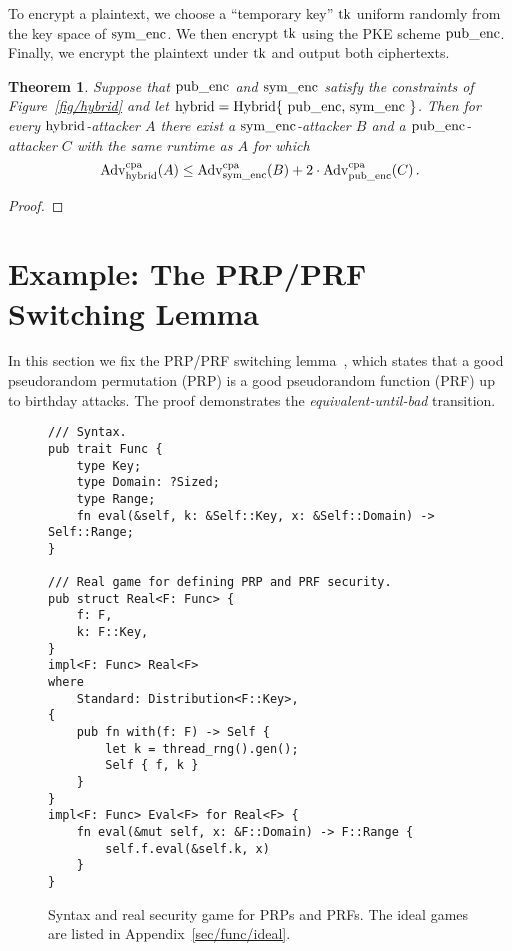 \documentclass{article}
\newtheorem{theorem}{Theorem}
\newcommand{\Adv}[1]{\textrm{\textup{Adv}}^{\textup{#1}}}
\newcommand{\code}[1]{\textrm{\textup{\lstinline{#1}}}}
\begin{document}
To encrypt a plaintext, we choose a ``temporary key'' $\code{tk}$ uniform
randomly from the key space of $\code{sym_enc}$.
%
We then encrypt $\code{tk}$ using the PKE scheme $\code{pub_enc}$.
%
Finally, we encrypt the plaintext under $\code{tk}$ and output both
ciphertexts.

\begin{theorem}\label{thm/hybrid}
  Suppose that $\code{pub_enc}$ and $\code{sym_enc}$ satisfy the constraints of
  Figure~\ref{fig/hybrid} and let $\code{hybrid} = \code{Hybrid\{
    pub_enc, sym_enc \}}$.
  Then for every $\code{hybrid}$-attacker $A$ there exist a
  $\code{sym_enc}$-attacker $B$ and a $\code{pub_enc}$-attacker $C$ with
  the same runtime as $A$ for which
  \[
    \Adv{cpa}_\code{hybrid}(A) \leq
      \Adv{cpa}_\code{sym_enc}(B) +
      2\cdot\Adv{cpa}_\code{pub_enc}(C) \,.
  \]
\end{theorem}

\begin{proof}
  
\end{proof}


\section{Example: The PRP/PRF Switching Lemma}\label{sec/switching}

In this section we fix the PRP/PRF switching lemma~\cite{BR06}, which states
that a good pseudorandom permutation (PRP) is a good pseudorandom function
(PRF) up to birthday attacks.
%
The proof demonstrates the \emph{equivalent-until-bad} transition.

\begin{figure}[t]
\begin{lstlisting}
/// Syntax.
pub trait Func {
    type Key;
    type Domain: ?Sized;
    type Range;
    fn eval(&self, k: &Self::Key, x: &Self::Domain) -> Self::Range;
}

/// Real game for defining PRP and PRF security.
pub struct Real<F: Func> {
    f: F,
    k: F::Key,
}
impl<F: Func> Real<F>
where
    Standard: Distribution<F::Key>,
{
    pub fn with(f: F) -> Self {
        let k = thread_rng().gen();
        Self { f, k }
    }
}
impl<F: Func> Eval<F> for Real<F> {
    fn eval(&mut self, x: &F::Domain) -> F::Range {
        self.f.eval(&self.k, x)
    }
}
\end{lstlisting}
  \caption{Syntax and real security game for PRPs and PRFs. The ideal games are
  listed in Appendix~\ref{sec/func/ideal}.}
  \label{fig/func/syntax}
  \label{fig/func/real}
\end{figure}
\end{document}
